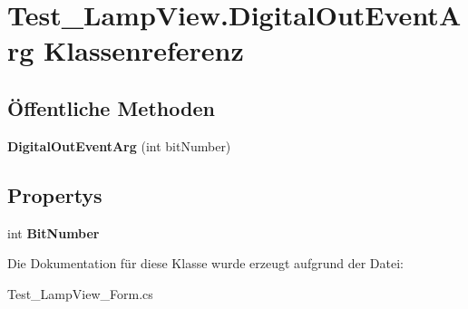 \hypertarget{class_test___lamp_view_1_1_digital_out_event_arg}{
\section{Test\_\-LampView.DigitalOutEventArg Klassenreferenz}
\label{class_test___lamp_view_1_1_digital_out_event_arg}
}
\subsection*{Öffentliche Methoden}
\begin{DoxyCompactItemize}
\item 
\hypertarget{class_test___lamp_view_1_1_digital_out_event_arg_a1f74109a1a14c365be62d74fb441be4c}{
{\bfseries DigitalOutEventArg} (int bitNumber)}
\label{class_test___lamp_view_1_1_digital_out_event_arg_a1f74109a1a14c365be62d74fb441be4c}

\end{DoxyCompactItemize}
\subsection*{Propertys}
\begin{DoxyCompactItemize}
\item 
\hypertarget{class_test___lamp_view_1_1_digital_out_event_arg_a2e91db32b8a2b3506e6ee4643d5a5a09}{
int {\bfseries BitNumber}}
\label{class_test___lamp_view_1_1_digital_out_event_arg_a2e91db32b8a2b3506e6ee4643d5a5a09}

\end{DoxyCompactItemize}


Die Dokumentation für diese Klasse wurde erzeugt aufgrund der Datei:\begin{DoxyCompactItemize}
\item 
Test\_\-LampView\_\-Form.cs\end{DoxyCompactItemize}

